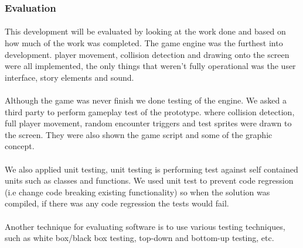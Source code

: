 \documentclass{article}
\begin{document}
\subsubsection{Evaluation}
\paragraph{}
This development will be evaluated by looking at the work done and based on how much of the work was completed. The game engine was the furthest into development. player movement, collision detection and drawing onto the screen were all implemented, the only things that weren't fully operational was the user interface, story elements and sound. 
\paragraph{} 
Although the game was never finish we done testing of the engine. We asked a third party to perform gameplay test of the prototype. where collision detection, full player movement, random encounter triggers and test sprites were drawn to the screen. They were also shown the game script and some of the graphic concept. 
\paragraph{}
We also applied unit testing, unit testing is performing test against self contained units such as classes and functions. We used unit test to prevent code regression (i.e change code breaking existing functionality) so when the solution was compiled, if there was any code regression the tests would fail.
\paragraph{}
Another technique for evaluating software is to use various testing techniques, such as white box/black box testing, top-down and bottom-up testing, etc.
\end{document}
